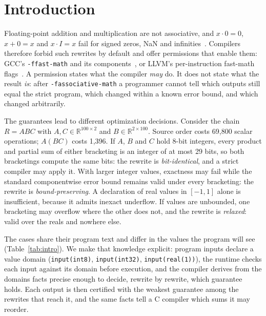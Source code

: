 \documentclass[acmsmall,review,anonymous,nonacm]{acmart}
\begin{document}
\maketitle

\section{Introduction}
Floating-point addition and multiplication are not associative, and
$x\cdot 0 = 0$, $x + 0 = x$ and $x \cdot I = x$ fail for signed zeros, NaN and
infinities~\cite{goldberg,ieee754}. Compilers therefore forbid such rewrites
by default and offer permissions that enable them: GCC's
\texttt{-ffast-math} and its components~\cite{gcc-opts}, or LLVM's
per-instruction fast-math flags~\cite{llvm-fmf}. A permission states what the
compiler \emph{may} do. It does not state what the result \emph{is}: after
\texttt{-fassociative-math} a programmer cannot tell which outputs still equal
the strict program, which changed within a known error bound, and which changed
arbitrarily.

The guarantees lead to different optimization decisions.
Consider the chain $R = ABC$ with $A, C \in \mathbb{R}^{100\times2}$ and
$B \in \mathbb{R}^{2\times100}$. Source order costs 69,800 scalar operations;
$A(BC)$ costs 1,396. If $A$, $B$ and $C$ hold 8-bit integers, every product
and partial sum of either bracketing is an integer of at most 29 bits, so both
bracketings compute the same bits: the rewrite is \emph{bit-identical}, and a
strict compiler may apply it. With larger integer values, exactness may fail while the standard
componentwise error bound remains valid under every bracketing: the rewrite
is \emph{bound-preserving}. A declaration of real values in $[-1,1]$ alone
is insufficient, because it admits inexact underflow. If values are
unbounded, one bracketing may overflow where the other does not, and the rewrite
is \emph{relaxed}: valid over the reals and nowhere else.

\begin{table}[t]
\caption{One chain $R=ABC$ ($40\times2$, $2\times40$, $40\times2$) over four
input domains under the repaired admission rule: modeled arithmetic after optimization (11,120 in source order)
and the certificate of \texttt{print(R)}, as our compiler reports them.}
\label{tab:intro}\centering\footnotesize

\end{table}
The cases share their program text and differ in the values the program
will see (Table~\ref{tab:intro}). We make that knowledge explicit: program inputs declare a value domain (\texttt{input(int8)},
\texttt{input(int32)}, \texttt{input(real(1))}), the runtime checks each input against its domain
before execution, and the compiler derives from the domains facts precise enough
to decide, rewrite by rewrite, which guarantee holds. Each output is then
certified with the weakest guarantee among the rewrites that reach it, and the
same facts tell a C compiler which sums it may reorder.
\end{document}
